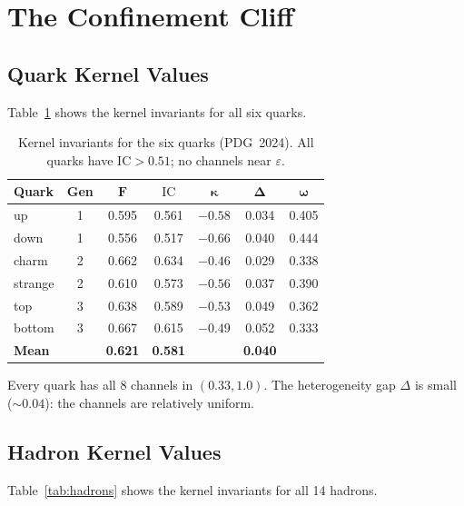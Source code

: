 \documentclass[
  aps,
  prd,
  twocolumn,
  superscriptaddress,
  nofootinbib,
  floatfix
]{revtex4-2}
\newcommand{\eps}{\varepsilon}
\newcommand{\IC}{\mathrm{IC}}
\begin{document}
\section{The Confinement Cliff}\label{sec:cliff}

\subsection{Quark Kernel Values}

Table~\ref{tab:quarks} shows the kernel invariants for all six
quarks.

\begin{table}[H]
\caption{Kernel invariants for the six quarks (PDG~2024).
All quarks have $\IC > 0.51$; no channels near $\eps$.}
\label{tab:quarks}
\centering\small
\begin{tabular}{@{}lcccccc@{}}
\toprule
\textbf{Quark} & \textbf{Gen} & $\bm{F}$ & $\bm{\IC}$ &
  $\bm{\kappa}$ & $\bm{\Delta}$ & $\bm{\omega}$ \\
\midrule
up      & 1 & 0.595 & 0.561 & $-0.58$ & 0.034 & 0.405 \\
down    & 1 & 0.556 & 0.517 & $-0.66$ & 0.040 & 0.444 \\
charm   & 2 & 0.662 & 0.634 & $-0.46$ & 0.029 & 0.338 \\
strange & 2 & 0.610 & 0.573 & $-0.56$ & 0.037 & 0.390 \\
top     & 3 & 0.638 & 0.589 & $-0.53$ & 0.049 & 0.362 \\
bottom  & 3 & 0.667 & 0.615 & $-0.49$ & 0.052 & 0.333 \\
\midrule
\textbf{Mean} & & \textbf{0.621} & \textbf{0.581} &
  & \textbf{0.040} & \\
\bottomrule
\end{tabular}
\end{table}

Every quark has all 8 channels in $(0.33, 1.0)$.
The heterogeneity gap $\Delta$ is small ($\sim 0.04$): the
channels are relatively uniform.

\subsection{Hadron Kernel Values}

Table~\ref{tab:hadrons} shows the kernel invariants for all 14
hadrons.
\end{document}
